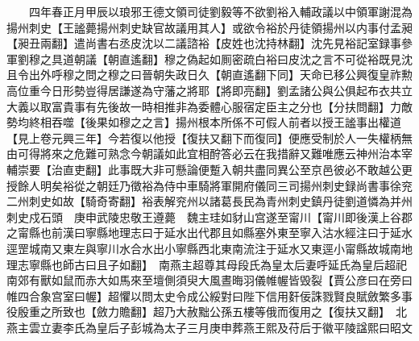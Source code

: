 　　四年春正月甲辰以琅邪王德文領司徒劉毅等不欲劉裕入輔政議以中領軍謝混為揚州刺史【王謐薨揚州刺史缺官故議用其人】或欲令裕於丹徒領揚州以内事付孟昶【昶丑兩翻】遣尚書右丞皮沈以二議諮裕【皮姓也沈持林翻】沈先見裕記室録事參軍劉穆之具道朝議【朝直遙翻】穆之偽起如厠密疏白裕曰皮沈之言不可從裕既見沈且令出外呼穆之問之穆之曰晉朝失政日久【朝直遙翻下同】天命已移公興復皇祚勲高位重今日形勢豈得居謙遂為守藩之將耶【將即亮翻】劉孟諸公與公俱起布衣共立大義以取富貴事有先後故一時相推非為委體心服宿定臣主之分也【分扶問翻】力敵勢均終相吞噬【後果如穆之之言】揚州根本所係不可假人前者以授王謐事出權道【見上卷元興三年】今若復以他授【復扶又翻下而復同】便應受制於人一失權柄無由可得將來之危難可熟念今朝議如此宜相酧答必云在我措辭又難唯應云神州治本宰輔崇要【治直吏翻】此事既大非可懸論便蹔入朝共盡同異公至京邑彼必不敢越公更授餘人明矣裕從之朝廷乃徵裕為侍中車騎將軍開府儀同三司揚州刺史録尚書事徐兖二州刺史如故【騎奇寄翻】裕表解兖州以諸葛長民為青州刺史鎮丹徒劉道憐為并州刺史戍石頭　庚申武陵忠敬王遵薨　魏主珪如豺山宫遂至甯川【甯川即後漢上谷郡之甯縣也前漢曰寧縣地理志曰于延水出代郡且如縣塞外東至寧入沽水經注曰于延水逕罡城南又東左與寧川水合水出小寧縣西北東南流注于延水又東逕小甯縣故城南地理志寧縣也師古曰且子如翻】　南燕主超尊其母段氏為皇太后妻呼延氏為皇后超祀南郊有獸如鼠而赤大如馬來至壇側須臾大風晝晦羽儀帷幄皆毁裂【賈公彦曰在旁曰帷四合象宫室曰幄】超懼以問太史令成公綏對曰陛下信用姧佞誅戮賢良賦斂繁多事役殷重之所致也【斂力贍翻】超乃大赦黜公孫五樓等俄而復用之【復扶又翻】　北燕主雲立妻李氏為皇后子彭城為太子三月庚申葬燕王熙及苻后于徽平陵諡熙曰昭文

